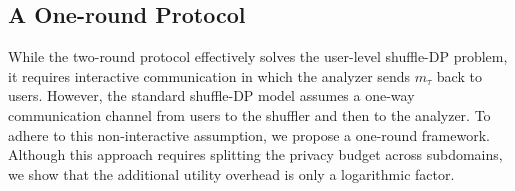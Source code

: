 \begin{algorithm}[t]
\caption{Randomizer}
\label{alg:Randomizer for one round}


\end{algorithm}




\subsection{A One-round Protocol}
\label{sec:static one-round}
While the two-round protocol effectively solves the user-level shuffle-DP problem, it requires interactive communication in which the analyzer sends $m_\tau$ back to users.
However, the standard shuffle-DP model assumes a one-way communication channel from users to the shuffler and then to the analyzer.
To adhere to this non-interactive assumption, we propose a one-round framework.
Although this approach requires splitting the privacy budget across subdomains, we show that the additional utility overhead is only a logarithmic factor.



